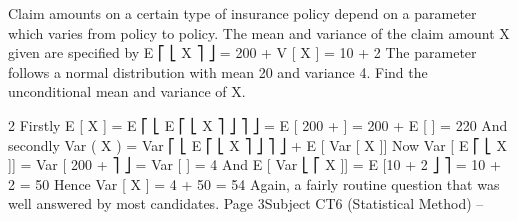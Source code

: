 \documentclass[a4paper,12pt]{article}
\begin{document}
Claim amounts on a certain type of insurance policy depend on a parameter \alpha  which
varies from policy to policy. The mean and variance of the claim amount X given \alpha 
are specified by
E ⎡ ⎣ X \alpha  ⎤ ⎦ = 200 + \alpha 
V [ X \alpha  ] = 10 + 2 \alpha 
The parameter \alpha  follows a normal distribution with mean 20 and variance 4.
Find the unconditional mean and variance of X.

2
Firstly
E [ X ] = E ⎡ ⎣ E ⎡ ⎣ X \alpha  ⎤ ⎦ ⎤ ⎦ = E [ 200 + \alpha  ] = 200 + E [ \alpha  ] = 220
And secondly
Var ( X ) = Var ⎡ ⎣ E ⎡ ⎣ X \alpha  ⎤ ⎦ ⎤ ⎦ + E [ Var [ X \alpha  ]]
Now
Var [ E ⎡ ⎣ X \alpha  ]] = Var [ 200 + \alpha  ⎤ ⎦ = Var [ \alpha  ] = 4
And
E [ Var ⎣ ⎡ X \alpha  ]] = E [10 + 2 \alpha  ⎦ ⎤ = 10 + 2  = 50
Hence
Var [ X ] = 4 + 50 = 54
Again, a fairly routine question that was well answered by most candidates.
Page 3Subject CT6 (Statistical Method) – %
\end{document}
